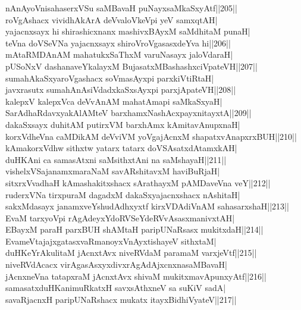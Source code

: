 \documentclass{article}
\begin{document}
nAnAyoVnisahaserxVSu saMBavaH puNayxsaMkaSxyAtf||205||\\
roVgAshacx vividhAkArA deVvaloVkeVpi yeV samxqtAH|\\
yajacnxsayx hi shirashicxnanx mashivxBAyxM saMdhitaM punaH|\\
teVna doVSeVNa yajacnxsayx shiroVroVgasasxdeYva hi||206||\\
mAtaRMDAnAM mahatukxSaThxM varuNasayx jaloVdaraH|\\
pUSoNxV dashanaveYkalayxM BujasatxMBashashxciVpateVH||207||\\
sumahAkaSxyaroVgashacx soVmasAyxpi parxkiVtiRtaH|\\
javxrasutx sumahAnAsiVdadxkaSxsAyxpi parxjApateVH||208||\\
kalepxV kalepxVca deVvAnAM mahatAmapi saMkaSxyaH|\\
SarAdhaRdavxyakAlAMteV barxhamxNashAcxpayxnitayxtA||209||\\
dakaSxsayx duhitAM putirxVM barxhAmx kAmitavAnupxnaH|\\
korxVdheVna caMDikAM deVviVM yoVgajAcnxM shapatxvAnapxrxBUH||210||\\
kAmakorxVdhw sithxtw yatarx tatarx doVSAsatxdAtamxkAH|\\
duHKAni ca samasAtxni saMsithxtAni na saMshayaH||211||\\
vishelxVSajanamxmaraNaM savARshitavxM haviBuRjaH|\\
sitxrxVvadhaH kAmashakitxshacx sArathayxM pAMDaveVna veY||212||\\
ruderxVNa tirxpuraM dagadxM dakaSxyajacnxshacx nAshitaH|\\
sakxMdasayx janamxveYshudAdhxyxtf kirxVDAdiVnAM sahasarxshaH||213||\\
EvaM tarxyoVpi rAgAdeyxYdoRVSeYdeRVvAsasxmanivxtAH|\\
EBayxM paraH parxBUH shAMtaH paripUNaRsasx mukitxdaH||214||\\
EvameVtajajxgatasxvaRmanoyxVnAyxtishayeV sithxtaM|\\
duHKeYrAkulitaM jAcnxtAvx niveRVdaM paramaM varxjeVtf||215||\\
niveRVdAcacx virAgasAsxyxdivxrAgAdAjxcnxnasaMBavaH|\\
jAcnxneVna tatapxraM jAcnxtAvx shivaM mukitxmavApunxyAtf||216||\\
samasatxduHKanimuRkatxH savxsAthxneV sa suKiV sadA|\\
savaRjacnxH paripUNaRshacx mukatx itayxBidhiVyateV||217||\\
\end{document}
